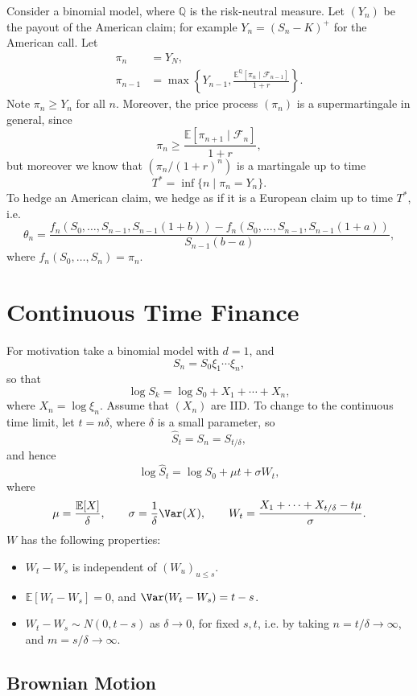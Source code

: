 \documentclass[12pt]{article}
\begin{document}
Consider a binomial model, where $\mathbb{Q}$ is the risk-neutral measure. Let $(Y_n)$ be the payout of the American claim; for example $Y_n = (S_n - K)^{+}$ for the American call. Let
\begin{align*}
	\pi_n &= Y_N, \\
	\pi_{n-1} &= \max\left\{Y_{n-1}, \frac{\mathbb{E}^{\mathbb{Q}}[\pi_n \mid \mathcal{F}_{n-1}]}{1 + r} \right\}.
\end{align*}
Note $\pi_n \geq Y_n$ for all $n$. Moreover, the price process $(\pi_n)$ is a supermartingale in general, since
\[
\pi_n \geq \frac{\mathbb{E}[\pi_{n+1} \mid \mathcal{F}_n]}{1 + r},
\]
but moreover we know that $(\pi_n/(1+r)^n)$ is a martingale up to time
\[
T^\ast = \inf\{ n \mid \pi_n = Y_n\}.
\]
To hedge an American claim, we hedge as if it is a European claim up to time $T^\ast$, i.e.
\[
\theta_n = \frac{f_n(S_0, \ldots, S_{n-1}, S_{n-1}(1+b)) - f_n(S_0, \ldots, S_{n-1}, S_{n-1}(1+a))}{S_{n-1}(b - a)},
\]
where $f_n(S_0, \ldots, S_n) = \pi_n$.


\newpage

\section{Continuous Time Finance}%
\label{sec:continuous}

For motivation take a binomial model with $d = 1$, and
\[
S_n = S_0 \xi_1 \cdots \xi_n,
\]
so that
\[
\log S_k = \log S_0 + X_1 + \cdots + X_n,
\]
where $X_n = \log \xi_n$. Assume that $(X_n)$ are IID. To change to the continuous time limit, let $t = n \delta$, where $\delta$ is a small parameter, so
\[
\hat S_t = S_n = S_{t/\delta},
\]
and hence
\[
\log \hat S_t = \log S_0 + \mu t + \sigma W_t,
\]
where
\[
\mu = \frac{\mathbb{E}[X]}{\delta}, \qquad \sigma = \frac{1}{\delta} \Var(X), \qquad W_t = \frac{X_1 + \cdots + X_{t/\delta} - t \mu}{\sigma}.
\]
$W$ has the following properties:
\begin{itemize}
	\item $W_t - W_s$ is independent of $(W_u)_{u \leq s}$.
	\item $\mathbb{E}[W_t - W_s] = 0$, and $\Var(W_t - W_s) = t - s$.
	\item $W_t - W_s \sim N(0, t - s)$ as $\delta \to 0$, for fixed $s, t$, i.e. by taking $n = t/\delta \to \infty$, and $m = s/\delta \to \infty$.
\end{itemize}

\subsection{Brownian Motion}%
\label{sub:brown}
\end{document}
